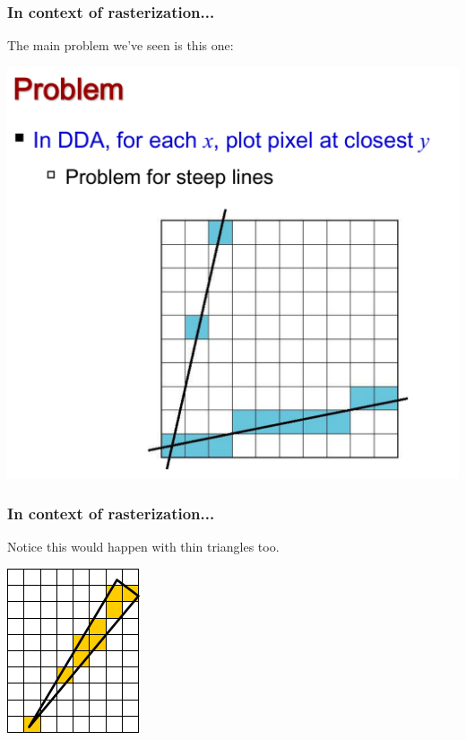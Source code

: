 \documentclass{beamer}
\begin{document}
\begin{frame}
    \frametitle{In context of rasterization...}

    The main problem we've seen is this one:

    \begin{center}
        \includegraphics[scale=0.3]{dda-problem.png}
    \end{center}

\end{frame}

\begin{frame}
    \frametitle{In context of rasterization...}

    Notice this would happen with thin triangles too.

    \begin{center}
        \includegraphics[]{thin-tri.png}
    \end{center}

\end{frame}
\end{document}
